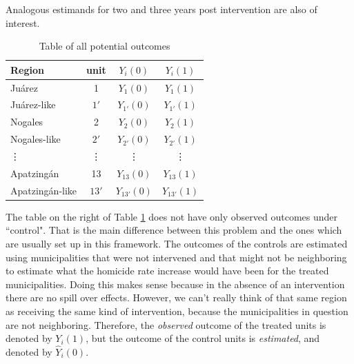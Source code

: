 \documentclass{article}[11 pt]
\begin{document}
				Analogous estimands for two and three years post intervention are also of interest.
					\begin{table}[htdp]
				        \begin{center}  
				        \begin{tabular}{|l|c|c|c|}
				            \hline
				            Region& unit& $Y_i(0)$&$Y_i(1)$\\
				            \hline
				            Ju\'{a}rez&1&$Y_1(0)$&$Y_1(1)$ \\
							Ju\'{a}rez-like&$1'$&$Y_{1'}(0)$&$Y_{1'}(1)$ \\
							\hline
							Nogales&2&$Y_2(0)$&$Y_2(1)$ \\
							Nogales-like&$2'$&$Y_{2'}(0)$&$Y_{2'}(1)$ \\
							\hline
							\vdots&\vdots&\vdots&\vdots \\
							\hline
				            Apatzing\'{a}n&13&$Y_{13}(0)$&$Y_{13}(1)$ \\
							Apatzing\'{a}n-like&$13'$&$Y_{{13}'}(0)$&$Y_{{13}'}(1)$  \\
				            \hline

				\end{tabular}
						\end{center}
								   \caption{Table of all potential outcomes}
			    \label{Tab2}
			\end{table}

The table on the right of Table \ref{Tab2} does not have only observed outcomes under ``control". That is the main difference between this problem and the ones which are usually set up in this framework. The outcomes of the controls are estimated using municipalities that were not intervened and that might not be neighboring to estimate what the homicide rate increase would have been for the treated municipalities. Doing this makes sense because in the absence of an intervention there are no spill over effects. However, we can't really think of that same region as receiving the same kind of intervention, because the municipalities in question are not neighboring. Therefore, the \emph{observed} outcome of the treated units is denoted by $Y_i(1)$, but the outcome of the control units is \emph{estimated}, and denoted by $\hat{Y}_i(0)$. 		
\end{document}
